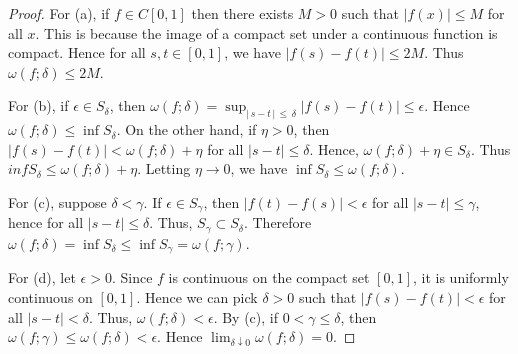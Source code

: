 \documentclass{article}
\begin{document}
\begin{proof}
For (a), if $f \in C[0,1]$ then there exists $M > 0$ such that $|f(x)| \le M$ for all $x$. This is because the image of a compact set under a continuous function is compact. Hence for all $s, t \in [0,1]$, we have $|f(s) - f(t)| \le 2M$.  Thus $\omega(f;\delta) \le 2M$.

For (b), if $\epsilon \in S_\delta$, then $\omega(f; \delta) = \sup_{|\,s-t\,|\,\le\, \delta} |f(s)-f(t)| \le \epsilon$. Hence $\omega(f; \delta) \le \inf S_\delta$.  On the other hand, if $\eta > 0$, then $|f(s) - f(t)| < \omega(f; \delta) + \eta$ for all $|s - t| \le \delta$.  Hence, $\omega(f; \delta) + \eta \in S_\delta$.  Thus $inf S_\delta \le \omega(f; \delta) + \eta$.  Letting $\eta \to 0$, we have $\inf S_\delta \le \omega(f ; \delta)$.

For (c), suppose $\delta < \gamma$.  If $\epsilon \in S_\gamma$, then $|f(t) - f(s)| < \epsilon$ for all $|s - t| \le \gamma$, hence for all $|s - t| \le \delta$.  Thus, $S_\gamma \subset S_\delta$.  Therefore $\omega(f; \delta) = \inf S_\delta \le \inf S_\gamma = \omega(f ; \gamma)$.

For (d), let $\epsilon > 0$.  Since $f$ is continuous on the compact set $[0,1]$, it is uniformly continuous on $[0,1]$.  Hence we can pick $\delta > 0$ such that $|f(s) - f(t)| < \epsilon$ for all $|s - t| < \delta$.  Thus, $\omega(f; \delta) < \epsilon$.  By (c), if $0 < \gamma \le \delta$, then $\omega(f ; \gamma) \le \omega(f ; \delta) < \epsilon$.  Hence $\lim_{\delta \downarrow 0} \omega(f; \delta) = 0$.
\end{proof}
\end{document}
